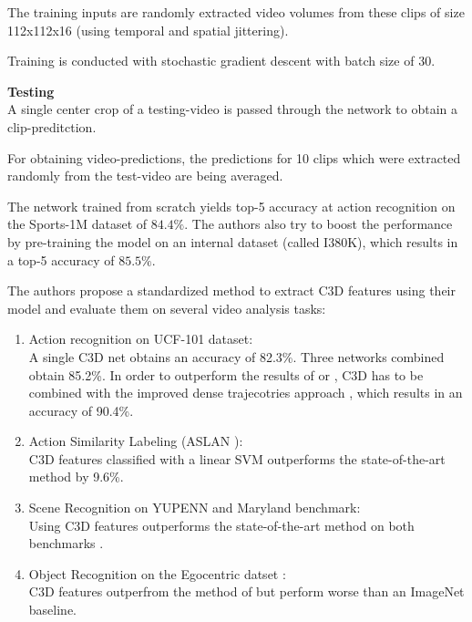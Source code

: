 The training inputs are randomly extracted video volumes from these clips of size 112x112x16 (using temporal and spatial jittering).

Training is conducted with stochastic gradient descent with batch size of 30.

\textbf{Testing} \\
A single center crop of a testing-video is passed through the network to obtain a clip-preditction.

For obtaining video-predictions, the predictions for 10 clips which were extracted randomly from the test-video are being averaged.

The network trained from scratch yields top-5 accuracy at action recognition on the Sports-1M dataset of $84.4\%$. The authors also try to boost the performance by pre-training the model on an internal dataset (called I380K), which results in a top-5 accuracy of $85.5\%$.

The authors propose a standardized method to extract C3D features using their model and evaluate them on several video analysis tasks:
\begin{enumerate}
    \item Action recognition on UCF-101 dataset: \\
    A single C3D net obtains an accuracy of 82.3\%.
    Three networks combined obtain 85.2\%.
    In order to outperform the results of \textcite{simonyan_two-stream_2014} or \textcite{ng_beyond_2015}, C3D has to be combined with the improved dense trajecotries approach \cite{wang_action_2013}, which results in an accuracy of 90.4\%.

    \item Action Similarity Labeling (ASLAN \cite{kliper-gross_action_2012}): \\
    C3D features classified with a linear SVM outperforms the state-of-the-art method \cite{peng_large_2014} by 9.6\%.

    \item Scene Recognition on YUPENN and Maryland benchmark: \\
    Using C3D features outperforms the state-of-the-art method on both benchmarks \cite{feichtenhofer_bags_2014}.

    \item Object Recognition on the Egocentric datset \cite{ren_egocentric_2009}: \\
    C3D features outperfrom the method of \cite{ren_egocentric_2009} but perform worse than an ImageNet baseline.
\end{enumerate}

